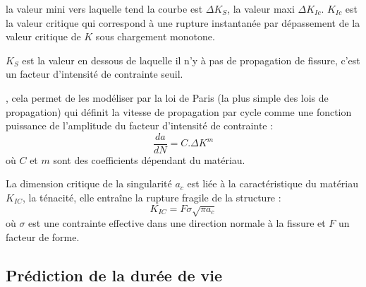 la valeur mini vers laquelle tend la courbe est $\Delta K_S$, la valeur maxi $\Delta K_{Ic}$.
$K_{Ic}$ est la valeur critique qui correspond à une rupture instantanée par dépassement de la
valeur critique de $K$ sous chargement monotone.

$K_S$ est la valeur en dessous de laquelle il n'y à pas de propagation de fissure, c'est un
facteur d'intensité de contrainte seuil.

\medskip
{}, cela permet de les
modéliser par la loi de Paris (la plus simple des lois de propagation) qui définit la vitesse de
propagation par cycle comme une fonction puissance de l'amplitude du facteur d'intensité de
contrainte :
\begin{equation} \dfrac{da}{dN} = C.\Delta K^m \end{equation}
où $C$ et $m$ sont des coefficients dépendant du matériau.

La dimension critique de la singularité  $a_c$  est liée à la caractéristique du matériau $K_{IC}$,
la ténacité, elle entraîne la rupture  fragile de la structure :
\begin{equation} K_{IC} = F \sigma \sqrt{\pi a_c} \end{equation}
où $\sigma$ est une contrainte effective dans une direction normale à la fissure et $F$ un
facteur de forme.




\medskip
\subsection{Prédiction de la durée de vie}


